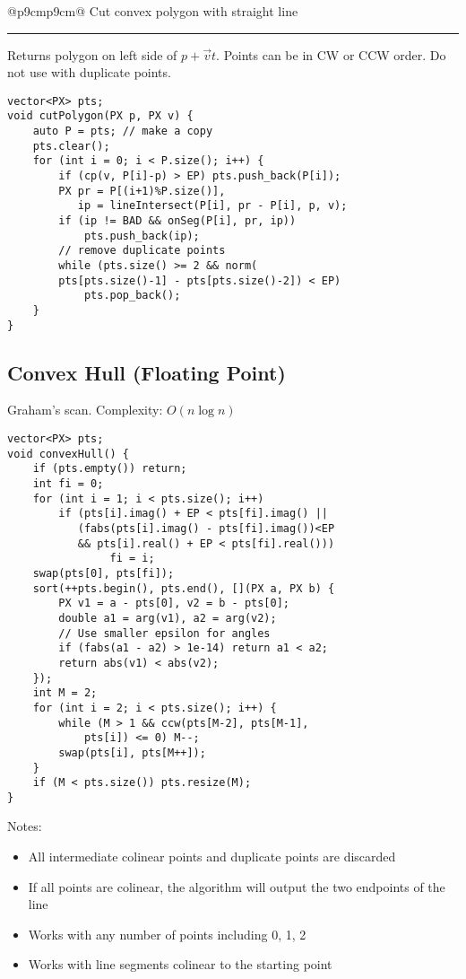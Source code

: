 \documentclass[letterpaper]{article}
\newcommand{\rx}[1]{#1\hrule}
\begin{document}
\clearpage

\begin{tabular}{@{}p{9cm}p{9cm}@{}}
\rx{Cut convex polygon with straight line}
\vspace{1mm}
Returns polygon on left side of $p+\vec vt$. Points can be in CW or CCW order. Do not use with duplicate points.
\begin{lstlisting}
vector<PX> pts;
void cutPolygon(PX p, PX v) {
	auto P = pts; // make a copy
	pts.clear();
	for (int i = 0; i < P.size(); i++) {
		if (cp(v, P[i]-p) > EP) pts.push_back(P[i]);
		PX pr = P[(i+1)%P.size()],
		   ip = lineIntersect(P[i], pr - P[i], p, v);
		if (ip != BAD && onSeg(P[i], pr, ip))
			pts.push_back(ip);
		// remove duplicate points
		while (pts.size() >= 2 && norm(
		pts[pts.size()-1] - pts[pts.size()-2]) < EP)
			pts.pop_back();
	}
}
\end{lstlisting}

\subsection{Convex Hull (Floating Point)}
Graham's scan. Complexity: $O\left(n\log n\right)$

\begin{lstlisting}
vector<PX> pts;
void convexHull() {
	if (pts.empty()) return;
	int fi = 0;
	for (int i = 1; i < pts.size(); i++)
		if (pts[i].imag() + EP < pts[fi].imag() || 
		   (fabs(pts[i].imag() - pts[fi].imag())<EP
		   && pts[i].real() + EP < pts[fi].real()))
				fi = i;
	swap(pts[0], pts[fi]);
	sort(++pts.begin(), pts.end(), [](PX a, PX b) {
		PX v1 = a - pts[0], v2 = b - pts[0];
		double a1 = arg(v1), a2 = arg(v2);
		// Use smaller epsilon for angles
		if (fabs(a1 - a2) > 1e-14) return a1 < a2;
		return abs(v1) < abs(v2);
	});
	int M = 2;
	for (int i = 2; i < pts.size(); i++) {
		while (M > 1 && ccw(pts[M-2], pts[M-1],
			pts[i]) <= 0) M--;
		swap(pts[i], pts[M++]);
	}
	if (M < pts.size()) pts.resize(M);
}
\end{lstlisting}

Notes:
\begin{itemize}
\item All intermediate colinear points and duplicate points are discarded
\item If all points are colinear, the algorithm will output the two endpoints of the line
\item Works with any number of points including 0, 1, 2
\item Works with line segments colinear to the starting point
\end{itemize}


\end{tabular}
\end{document}
